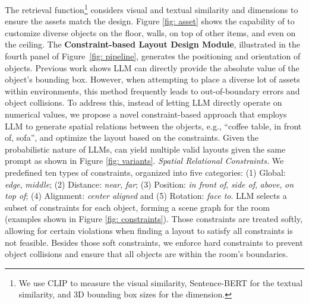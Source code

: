 The retrieval function\footnote{We use CLIP \cite{radford2021learning} to measure the visual similarity, Sentence-BERT \cite{reimers-2019-sentence-bert} for the textual similarity, and 3D bounding box sizes for the dimension.} considers visual and textual similarity and dimensions to ensure the assets match the design. Figure \ref{fig: asset} shows the capability of \holodeck to customize diverse objects on the floor, walls, on top of other items, and even on the ceiling.
\smallbreak
\noindent The \textbf{Constraint-based Layout Design Module}, illustrated in the fourth panel of Figure~\ref{fig: pipeline}, generates the positioning and orientation of objects. Previous work \cite{feng2023layoutgpt} shows LLM can directly provide the absolute value of the object's bounding box. However, when attempting to place a diverse lot of assets within environments, this method frequently leads to out-of-boundary errors and object collisions. To address this, instead of letting LLM directly operate on numerical values, we propose a novel constraint-based approach that employs LLM to generate spatial relations between the objects, e.g., ``coffee table, in front of, sofa'', and optimize the layout based on the constraints. Given the probabilistic nature of LLMs, \holodeck can yield multiple valid layouts given the same prompt as shown in Figure \ref{fig: variants}.
\smallbreak
\noindent \textit{Spatial Relational Constraints.} We predefined ten types of constraints, organized into five categories: (1) Global: \textit{edge}, \textit{middle}; (2) Distance: \textit{near}, \textit{far}; (3) Position: \textit{in front of}, \textit{side of}, \textit{above}, \textit{on top of}; (4) Alignment: \textit{center aligned} and (5) Rotation: \textit{face to}. LLM selects a subset of constraints for each object, forming a scene graph for the room (examples shown in Figure \ref{fig: constraints}). Those constraints are treated softly, allowing for certain violations when finding a layout to satisfy all constraints is not feasible. Besides those soft constraints, we enforce hard constraints to prevent object collisions and ensure that all objects are within the room's boundaries. 
\smallbreak
